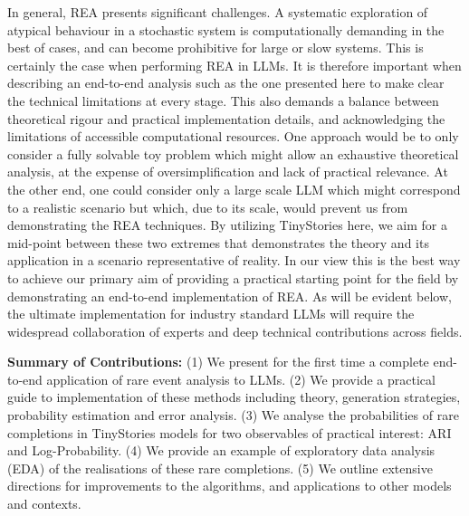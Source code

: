 \documentclass{article}
\begin{document}
In general, REA presents significant challenges. A systematic exploration of atypical behaviour in a stochastic system is computationally demanding in the best of cases, and can become prohibitive for large or slow systems. This is certainly the case when performing REA in LLMs. It is therefore important when describing an end-to-end analysis such as the one presented here to make clear the technical limitations at every stage. This also demands a balance between theoretical rigour and practical implementation details, and acknowledging the limitations of accessible computational resources. One approach would be to only consider a fully solvable toy problem which might allow an exhaustive theoretical analysis, at the expense of oversimplification and lack of practical relevance. At the other end, one could consider only a large scale LLM which might correspond to a realistic scenario but which, due to its scale, would prevent us from demonstrating the REA techniques. By utilizing TinyStories here, we aim for a mid-point between these two extremes that demonstrates the theory and its application in a scenario representative of reality. In our view this is the best way to achieve our primary aim of providing a practical starting point for the field by demonstrating an end-to-end implementation of REA. As will be evident below, the ultimate implementation for industry standard LLMs will require the widespread collaboration of experts and deep technical contributions across fields.


\textbf{Summary of Contributions:} (1) We present for the first time a complete end-to-end application of rare event analysis to LLMs.
(2) We provide a practical guide to implementation of these methods including theory, generation strategies, probability estimation and error analysis.
(3) We analyse the probabilities of rare completions in TinyStories models for two observables of practical interest: ARI and Log-Probability.
(4) We provide an example of exploratory data analysis (EDA) of the realisations of these rare completions.
(5) We outline extensive directions for improvements to the algorithms, and applications to other models and contexts.
\end{document}
